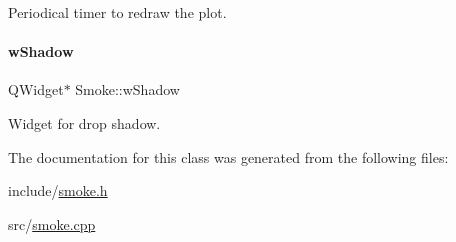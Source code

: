 Periodical timer to redraw the plot. 

\mbox{\label{classSmoke_aa6b959618b43da0106cc49148be321e8}} 
\paragraph{\texorpdfstring{wShadow}{wShadow}}
{\footnotesize\ttfamily Q\+Widget$\ast$ Smoke\+::w\+Shadow\hspace{0.3cm}{\ttfamily [private]}}



Widget for drop shadow. 



The documentation for this class was generated from the following files\+:\begin{DoxyCompactItemize}
\item 
include/\mbox{\hyperlink{smoke_8h}{smoke.\+h}}\item 
src/\mbox{\hyperlink{smoke_8cpp}{smoke.\+cpp}}\end{DoxyCompactItemize}
